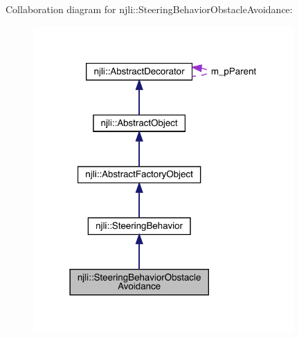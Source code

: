 Collaboration diagram for njli\+:\+:Steering\+Behavior\+Obstacle\+Avoidance\+:\nopagebreak
\begin{figure}[H]
\begin{center}
\leavevmode
\includegraphics[width=282pt]{classnjli_1_1_steering_behavior_obstacle_avoidance__coll__graph}
\end{center}
\end{figure}
